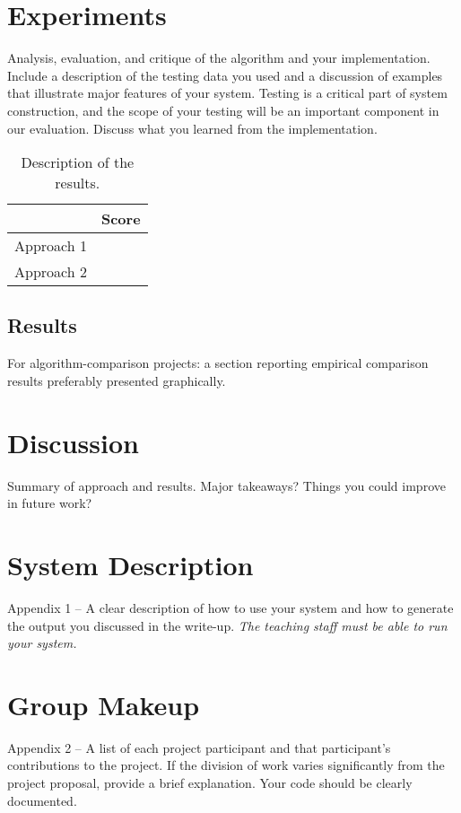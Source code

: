 \documentclass[11pt]{article}
\begin{document}
\section{Experiments}
Analysis, evaluation, and critique of the algorithm and your
implementation. Include a description of the testing data you used and
a discussion of examples that illustrate major features of your
system. Testing is a critical part of system construction, and the
scope of your testing will be an important component in our
evaluation. Discuss what you learned from the implementation.

\begin{table}
  \centering
  \begin{tabular}{ll}
    \toprule
    & Score \\
    \midrule
    Approach 1 & \\
    Approach 2 & \\
    \bottomrule
  \end{tabular}
  \caption{Description of the results.}
\end{table}


\subsection{Results}

 For algorithm-comparison projects: a section reporting empirical comparison results preferably presented graphically.


\section{Discussion}

Summary of approach and results. Major takeaways? Things you could improve in future work?

\appendix

\section{System Description}

 Appendix 1 – A clear description of how to use your system and how to generate the output you discussed in the write-up. \emph{The teaching staff must be able to run your system.}

\section{Group Makeup}

 Appendix 2 – A list of each project participant and that
participant’s contributions to the project. If the division of work
varies significantly from the project proposal, provide a brief
explanation.  Your code should be clearly documented.





\end{document}

